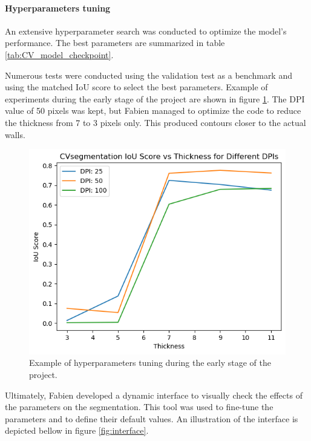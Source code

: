 \documentclass[11pt]{article}
\begin{document}
\paragraph{Hyperparameters tuning}
An extensive hyperparameter search was conducted to optimize the model's
performance. The best parameters are summarized in table \ref{tab:CV_model_checkpoint}.

Numerous tests were conducted using the validation test as a benchmark and using
the matched IoU score to select the best parameters. Example of experiments during the 
early stage of the project are shown in figure \ref{fig:hyperparameters_tuning}.
The DPI value of 50 pixels was kept, but Fabien managed to optimize the code to 
reduce the thickness from 7 to 3 pixels only. This produced contours closer to the 
actual walls.

\begin{figure}[htb!]
    \centering
    \includegraphics[width=0.5\linewidth]{figures/CVsegmentation_score.png}
    \caption{Example of hyperparameters tuning during the
    early stage of the project.}
    \label{fig:hyperparameters_tuning}
\end{figure}

Ultimately, Fabien developed a dynamic interface to visually check the effects 
of the parameters on the segmentation. This tool was used to fine-tune the
parameters and to define their default values. An illustration of the interface 
is depicted bellow in figure \ref{fig:interface}.
\end{document}
